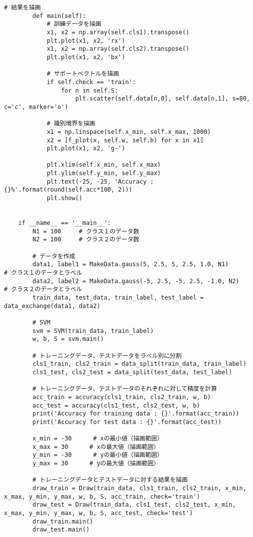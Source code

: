 \begin{lstlisting}[caption=課題1におけるSVM学習用プログラム]
        # 結果を描画
        def main(self):
            # 訓練データを描画
            x1, x2 = np.array(self.cls1).transpose()
            plt.plot(x1, x2, 'rx')    
            x1, x2 = np.array(self.cls2).transpose()
            plt.plot(x1, x2, 'bx')

            # サポートベクトルを描画
            if self.check == 'train':
                for n in self.S:
                    plt.scatter(self.data[n,0], self.data[n,1], s=80, c='c', marker='o')
            
            # 識別境界を描画
            x1 = np.linspace(self.x_min, self.x_max, 1000)
            x2 = [f_plot(x, self.w, self.b) for x in x1]
            plt.plot(x1, x2, 'g-')

            plt.xlim(self.x_min, self.x_max)
            plt.ylim(self.y_min, self.y_max)
            plt.text(-25, -25, 'Accuracy : {}%'.format(round(self.acc*100, 2)))
            plt.show()


    if __name__ == '__main__':
        N1 = 100     # クラス１のデータ数
        N2 = 100     # クラス２のデータ数

        # データを作成
        data1, label1 = MakeData.gauss(5, 2.5, 5, 2.5, 1.0, N1)       # クラス１のデータとラベル
        data2, label2 = MakeData.gauss(-5, 2.5, -5, 2.5, -1.0, N2)        # クラス２のデータとラベル
        train_data, test_data, train_label, test_label = data_exchange(data1, data2)

        # SVM
        svm = SVM(train_data, train_label)
        w, b, S = svm.main()

        # トレーニングデータ、テストデータをラベル別に分割
        cls1_train, cls2_train = data_split(train_data, train_label)
        cls1_test, cls2_test = data_split(test_data, test_label)

        # トレーニングデータ、テストデータのそれぞれに対して精度を計算
        acc_train = accuracy(cls1_train, cls2_train, w, b)
        acc_test = accuracy(cls1_test, cls2_test, w, b)
        print('Accuracy for training data : {}'.format(acc_train))
        print('Accuracy for test data : {}'.format(acc_test))
        
        x_min = -30      # xの最小値（描画範囲）
        x_max = 30      # xの最大値（描画範囲）
        y_min = -30      # yの最小値（描画範囲）
        y_max = 30      # yの最大値（描画範囲）

        # トレーニングデータとテストデータに対する結果を描画
        draw_train = Draw(train_data, cls1_train, cls2_train, x_min, x_max, y_min, y_max, w, b, S, acc_train, check='train')
        draw_test = Draw(train_data, cls1_test, cls2_test, x_min, x_max, y_min, y_max, w, b, S, acc_test, check='test')
        draw_train.main()
        draw_test.main()
\end{lstlisting}